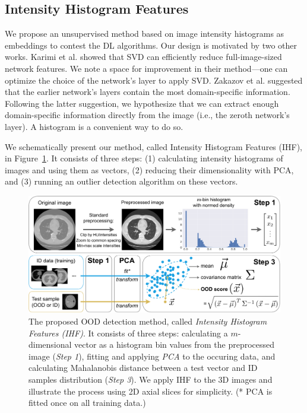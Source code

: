 \subsection{Intensity Histogram Features}

We propose an unsupervised method based on image intensity histograms as embeddings to contest the DL algorithms. Our design is motivated by two other works. Karimi et al. \cite{karimi2022improving} showed that SVD can efficiently reduce full-image-sized network features. We note a space for improvement in their method---one can optimize the choice of the network's layer to apply SVD. Zakazov et al. \cite{zakazov2021anatomy} suggested that the earlier network's layers contain the most domain-specific information. Following the latter suggestion, we hypothesize that we can extract enough domain-specific information directly from the image (i.e., the zeroth network's layer). A histogram is a convenient way to do so.

We schematically present our method, called Intensity Histogram Features (IHF), in Figure~\ref{fig:ihf}. It consists of three steps: (1) calculating intensity histograms of images and using them as vectors, (2) reducing their dimensionality with PCA, and (3) running an outlier detection algorithm on these vectors.

\begin{figure}[h]
	\centering
	\includegraphics[width=\textwidth]{Dissertation/Figures/5_ood_bench/method-1.pdf}
	\caption{The proposed OOD detection method, called \textit{Intensity Histogram Features (IHF)}. It consists of three steps: calculating a $m$-dimensional vector as a histogram bin values from the preprocessed image (\textit{Step 1}), fitting and applying \textit{PCA} to the occuring data, and calculating Mahalanobis distance between a test vector and ID samples distribution (\textit{Step 3}). We apply IHF to the 3D images and illustrate the process using 2D axial slices for simplicity. (* PCA is fitted once on all training data.)}
	\label{fig:ihf}
\end{figure}

